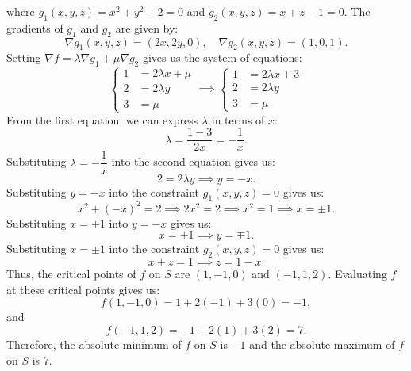 \documentclass[11pt]{article}
\begin{document}
where \(g_1(x, y, z) = x^2 + y^2 - 2 = 0\) and \(g_2(x, y, z) = x + z - 1 = 0\). The gradients of \(g_1\) and \(g_2\) are given by:
\[\nabla g_1(x, y, z) = (2x, 2y, 0), \quad \nabla g_2(x, y, z) = (1, 0, 1).\]
Setting \(\nabla f = \lambda \nabla g_1 + \mu \nabla g_2\) gives us the system of equations:
\[\begin{cases}
1 & = 2\lambda x + \mu \\
2 & = 2\lambda y \\
3 & = \mu
\end{cases} \implies
\begin{cases}
1 & = 2\lambda x + 3 \\
2 & = 2\lambda y \\
3 & = \mu
\end{cases}\]
From the first equation, we can express \(\lambda\) in terms of \(x\):
\[\lambda = \frac{1 - 3}{2x} = -\frac{1}{x}.\]
Substituting \(\lambda = -\dfrac{1}{x}\) into the second equation gives us:
\[2 = 2\lambda y \implies y = -x.\]
Substituting \(y = -x\) into the constraint \(g_1(x, y, z) = 0\) gives us:
\[x^2 + (-x)^2 = 2 \implies 2x^2 = 2 \implies x^2 = 1 \implies x = \pm 1.\]
Substituting \(x = \pm 1\) into \(y = -x\) gives us:
\[x = \pm 1 \implies y = \mp 1.\]
Substituting \(x = \pm 1\) into the constraint \(g_2(x, y, z) = 0\) gives us:
\[x + z = 1 \implies z = 1 - x.\]
Thus, the critical points of \(f\) on \(S\) are \((1, -1, 0)\) and \((-1, 1, 2)\). Evaluating \(f\) at these critical points gives us:
\[f(1, -1, 0) = 1 + 2(-1) + 3(0) = -1,\]
and
\[f(-1, 1, 2) = -1 + 2(1) + 3(2) = 7.\]
Therefore, the absolute minimum of \(f\) on \(S\) is \(-1\) and the absolute maximum of \(f\) on \(S\) is \(7\).
\end{document}
